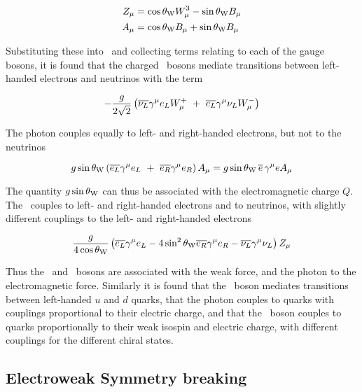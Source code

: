 \begin{align}
Z_{\mu} & = \cos{\ensuremath{\theta_{\mathrm{W}}}} W^{3}_{\mu} - \sin{\ensuremath{\theta_{\mathrm{W}}}} B_{\mu} \\
A_{\mu} & = \cos{\ensuremath{\theta_{\mathrm{W}}}} B_{\mu} + \sin{\ensuremath{\theta_{\mathrm{W}}}} B_{\mu}
\end{align}

Substituting these into~ and collecting terms
relating to each of the gauge bosons, it is found that the
charged \Wpm\ bosons mediate transitions between left-handed electrons and
neutrinos with the term

\begin{equation}
- \frac{g}{2\sqrt{2}} \left( \overline{\nu_{L}} \gamma^{\mu} e_{L} W^{+}_{\mu}
\ + \  \overline{e_{L}} \gamma^{\mu} \nu_{L} W^{-}_{\mu} \right)
\end{equation}

The photon couples equally to left- and right-handed electrons, but not to the
neutrinos

\begin{equation}
g \sin{\ensuremath{\theta_{\mathrm{W}}}} \left( \overline{e_{L}} \gamma^{\mu} e_{L} 
\ + \ \overline{e_{R}} \gamma^{\mu} e_{R} \right) A_{\mu}
 = g \sin{\ensuremath{\theta_{\mathrm{W}}}} \, \overline{e}\, \gamma^{\mu} e A_{\mu}
\end{equation}

The quantity $g \sin{\ensuremath{\theta_{\mathrm{W}}}}$ can thus be associated with the electromagnetic
charge $Q$. The \Z\ couples to left- and right-handed electrons and to
neutrinos, with slightly different couplings to the left- and right-handed
electrons

\begin{equation}
\frac{g}{4 \cos{\ensuremath{\theta_{\mathrm{W}}}}} \left( 
\overline{e_{L}} \gamma^{\mu} e_{L}  - 4 \sin^{2}{\theta_{\mathrm{W}}} \overline{e_{R}} \gamma^{\mu} e_{R} 
- \overline{\nu_{L}} \gamma^{\mu} \nu_{L} 
\right)Z_{\mu}
\end{equation}

Thus the \W\ and \Z\ bosons are associated with the weak force, and the photon
to the electromagnetic force. Similarly it is found that the \W\ boson mediates
transitions between left-handed $u$ and $d$ quarks, that the photon couples to
quarks with couplings proportional to their electric charge, and that the
\Z\ boson couples to quarks proportionally to their weak isospin and electric
charge, with different couplings for the different chiral states.



\subsection{Electroweak Symmetry breaking}

